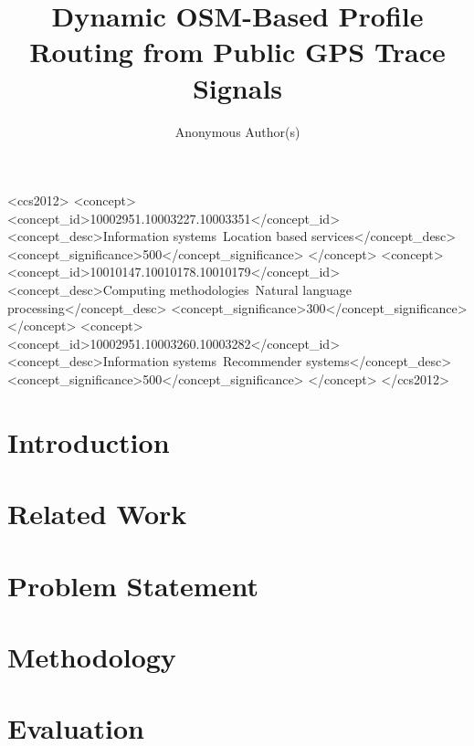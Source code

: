 \documentclass[sigconf,review,anonymous]{acmart}
\title{Dynamic OSM-Based Profile Routing from Public GPS Trace Signals}
\author{Anonymous Author(s)}
\affiliation{%
  \institution{Anonymous Institution}
  \city{Anonymous}
  \country{Anonymous}}
\begin{document}
\begin{abstract}

\end{abstract}

\begin{CCSXML}
<ccs2012>
 <concept>
  <concept_id>10002951.10003227.10003351</concept_id>
  <concept_desc>Information systems~Location based services</concept_desc>
  <concept_significance>500</concept_significance>
 </concept>
 <concept>
  <concept_id>10010147.10010178.10010179</concept_id>
  <concept_desc>Computing methodologies~Natural language processing</concept_desc>
  <concept_significance>300</concept_significance>
 </concept>
 <concept>
  <concept_id>10002951.10003260.10003282</concept_id>
  <concept_desc>Information systems~Recommender systems</concept_desc>
  <concept_significance>500</concept_significance>
 </concept>
</ccs2012>
\end{CCSXML}



\maketitle

\section{Introduction}


\section{Related Work}


\section{Problem Statement}


\section{Methodology}


\section{Evaluation}

\end{document}
